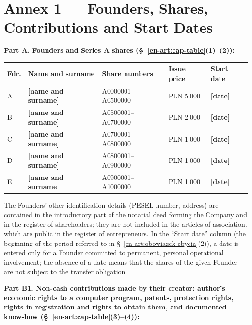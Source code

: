 \documentclass[12pt,a4paper]{report}
\newcommand{\field}[1]{\textbf{[#1]}}
\begin{document}
\newpage

\section*{Annex 1 --- Founders, Shares, Contributions and Start Dates}

\textbf{Part A. Founders and Series A shares (\S~\ref{en-art:cap-table}(1)--(2)):}

\begin{center}
\begin{tabularx}{\linewidth}{@{}p{0.9cm} >{\raggedright\arraybackslash}X p{4.2cm} p{1.9cm} p{2.3cm}@{}}
\toprule
\textbf{Fdr.} & \textbf{Name and surname} & \textbf{Share numbers} & \textbf{Issue price} & \textbf{Start date} \\
\midrule
A & \field{name and surname} & A0000001--A0500000 & PLN 5,000 & \field{date} \\
B & \field{name and surname} & A0500001--A0700000 & PLN 2,000 & \field{date} \\
C & \field{name and surname} & A0700001--A0800000 & PLN 1,000 & \field{date} \\
D & \field{name and surname} & A0800001--A0900000 & PLN 1,000 & \field{date} \\
E & \field{name and surname} & A0900001--A1000000 & PLN 1,000 & \field{date} \\
\bottomrule
\end{tabularx}
\end{center}

The Founders' other identification details (PESEL number, address) are contained in the introductory part of the notarial deed forming the Company and in the register of shareholders; they are not included in the articles of association, which are public in the register of entrepreneurs. In the ``Start date'' column (the beginning of the period referred to in \S~\ref{en-art:obowiazek-zbycia}(2)), a date is entered only for a Founder committed to permanent, personal operational involvement; the absence of a date means that the shares of the given Founder are not subject to the transfer obligation.

\textbf{Part B1. Non-cash contributions made by their creator: author's economic rights to a computer program, patents, protection rights, rights in registration and rights to obtain them, and documented know-how (\S~\ref{en-art:cap-table}(3)--(4)):}
\end{document}
